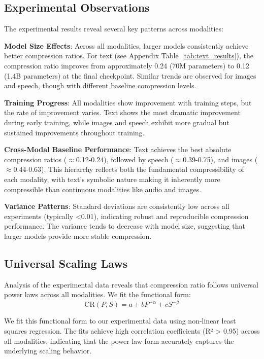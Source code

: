 \documentclass[11pt]{article}
\begin{document}
\subsection{Experimental Observations}

The experimental results reveal several key patterns across modalities:

\textbf{Model Size Effects}: Across all modalities, larger models consistently achieve better compression ratios. For text (see Appendix Table~\ref{tab:text_results}), the compression ratio improves from approximately 0.24 (70M parameters) to 0.12 (1.4B parameters) at the final checkpoint. Similar trends are observed for images and speech, though with different baseline compression levels.

\textbf{Training Progress}: All modalities show improvement with training steps, but the rate of improvement varies. Text shows the most dramatic improvement during early training, while images and speech exhibit more gradual but sustained improvements throughout training.

\textbf{Cross-Modal Baseline Performance}: Text achieves the best absolute compression ratios ($\approx$0.12-0.24), followed by speech ($\approx$0.39-0.75), and images ($\approx$0.44-0.63). This hierarchy reflects both the fundamental compressibility of each modality, with text's symbolic nature making it inherently more compressible than continuous modalities like audio and images.

\textbf{Variance Patterns}: Standard deviations are consistently low across all experiments (typically <0.01), indicating robust and reproducible compression performance. The variance tends to decrease with model size, suggesting that larger models provide more stable compression.

\subsection{Universal Scaling Laws}

Analysis of the experimental data reveals that compression ratio follows universal power laws across all modalities. We fit the functional form:
\[
\mathrm{CR}(P,S) = a + b P^{-\alpha} + c S^{-\beta}
\]

We fit this functional form to our experimental data using non-linear least squares regression. The fits achieve high correlation coefficients (R² > 0.95) across all modalities, indicating that the power-law form accurately captures the underlying scaling behavior.
\end{document}
